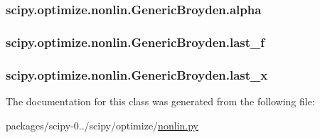 \subsubsection[{alpha}]{\setlength{\rightskip}{0pt plus 5cm}scipy.\+optimize.\+nonlin.\+Generic\+Broyden.\+alpha}\label{classscipy_1_1optimize_1_1nonlin_1_1GenericBroyden_a9624177ee4561c1f8a87dd4ad57b4d06}
\hypertarget{classscipy_1_1optimize_1_1nonlin_1_1GenericBroyden_a7f5af5ab68adb5f4b2279e5c010c9840}{}
\subsubsection[{last\+\_\+f}]{\setlength{\rightskip}{0pt plus 5cm}scipy.\+optimize.\+nonlin.\+Generic\+Broyden.\+last\+\_\+f}\label{classscipy_1_1optimize_1_1nonlin_1_1GenericBroyden_a7f5af5ab68adb5f4b2279e5c010c9840}
\hypertarget{classscipy_1_1optimize_1_1nonlin_1_1GenericBroyden_a5dc8b892e6f2f6e6a15268df238523a1}{}
\subsubsection[{last\+\_\+x}]{\setlength{\rightskip}{0pt plus 5cm}scipy.\+optimize.\+nonlin.\+Generic\+Broyden.\+last\+\_\+x}\label{classscipy_1_1optimize_1_1nonlin_1_1GenericBroyden_a5dc8b892e6f2f6e6a15268df238523a1}


The documentation for this class was generated from the following file\+:\begin{DoxyCompactItemize}
\item 
packages/scipy-\/0../scipy/optimize/\hyperlink{nonlin_8py}{nonlin.\+py}\end{DoxyCompactItemize}
